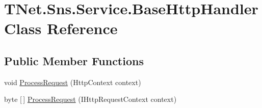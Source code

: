 \hypertarget{class_t_net_1_1_sns_1_1_service_1_1_base_http_handler}{}\section{T\+Net.\+Sns.\+Service.\+Base\+Http\+Handler Class Reference}
\label{class_t_net_1_1_sns_1_1_service_1_1_base_http_handler}


 


\subsection*{Public Member Functions}
\begin{DoxyCompactItemize}
\item 
void \mbox{\hyperlink{class_t_net_1_1_sns_1_1_service_1_1_base_http_handler_a4231bc4480d621ece1a90177718b09d7}{Process\+Request}} (Http\+Context context)
\item 
byte \mbox{[}$\,$\mbox{]} \mbox{\hyperlink{class_t_net_1_1_sns_1_1_service_1_1_base_http_handler_af5d8b3bebfde005aa40daaebac2465bd}{Process\+Request}} (I\+Http\+Request\+Context context)
\end{DoxyCompactItemize}
